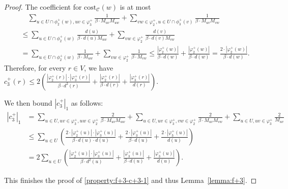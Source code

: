 \documentclass[11pt]{article}
\newcommand{\cost}{\mathrm{cost}}
\begin{document}
\begin{CJK*}{UTF8}{gbsn}
\begin{proof}
{The coefficient for $\cost_{\mathcal{C}}(w)$ is at most 
\begin{align*}
    &\quad\sum_{u \in U \cap \phi^+_2(w), uv \in \varphi^+_3} \frac{1}{\beta \cdot M_{uv} M_{uw}} + \sum_{vw\in\varphi^+_2, u \in U \cap \phi^+_3(v)} \frac{1}{\beta\cdot M_{uv}M_{vw}} \\
    &\leq \sum_{u \in U \cap \phi^+_2(w)}\frac{d(u)}{\beta \cdot d(u)M_{uw}} + \sum_{vw\in\varphi^+_2} \frac{d(v)}{\beta\cdot d(v)M_{vw}} \\
    &=\sum_{u \in U \cap \phi^+_2(w)}\frac{1}{\beta \cdot M_{uw}} + \sum_{vw\in\varphi^+_2} \frac{1}{\beta\cdot M_{vw}} \leq \frac{|\varphi^+_2(w)|}{\beta \cdot d(w)} + \frac{|\varphi^+_2(w)|}{\beta \cdot d(w)} = \frac{2\cdot|\varphi^+_2(w)|}{\beta \cdot d(w)}.
\end{align*}
Therefore, for every $r \in V$, we have $c^+_3(r) \leq 2\left(\frac{|\varphi^+_2(r)|\cdot |\varphi^+_3(r)|}{\beta\cdot d^2(r)} + \frac{|\varphi^+_2(r)|}{\beta\cdot d(r)} + \frac{|\varphi^+_3(r)|}{d(r)} \right)$.

We then bound $|c^+_3|_1$ as follows:
\begin{align*}
|c^+_3|_1&= \sum_{u \in U, uv \in \varphi^+_3, uw \in \varphi^+_2} \frac{2}{\beta \cdot M_{uv}M_{uw}} + \sum_{u \in U, uv \in \varphi^+_3, vw \in \varphi^+_2} \frac{2}{\beta \cdot M_{uv}M_{vw}} + \sum_{u \in U, uv \in \varphi^+_3} \frac{2}{M_{uv}}\\ 
&\leq \sum_{u \in U} \left( \frac{2\cdot|\varphi^+_2(u)|\cdot|\varphi^+_3(u)|}{\beta \cdot d(u) \cdot d(u)} + \frac{2\cdot |\varphi^+_3(u)|}{\beta \cdot d(u)}  + \frac{2\cdot |\varphi^+_3(u)|}{d(u)}  \right)\\
&= 2 \sum_{u \in U} \left(\frac{|\varphi^+_2(u)|\cdot|\varphi^+_3(u)|}{\beta \cdot d^2(u)} + \frac{|\varphi^+_3(u)|}{\beta \cdot d(u)} + \frac{|\varphi^+_3(u)|}{d(u)}\right).
\end{align*}
}
This finishes the proof of \ref{property:f+3-c+3-1} and thus Lemma~\ref{lemma:f+3}.
\end{proof}


\end{CJK*}
\end{document}
